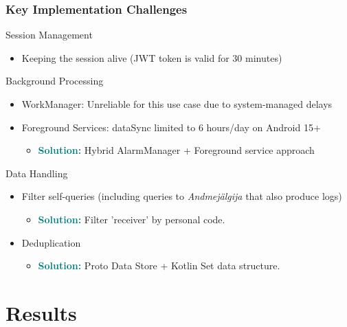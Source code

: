 \documentclass[aspectratio=169,11pt]{beamer}
\begin{document}
\begin{frame}
\frametitle{Key Implementation Challenges}
\begin{block}{Session Management}
\begin{itemize}
    \item Keeping the session alive (JWT token is valid for 30 minutes)
\end{itemize}
\end{block}

\begin{block}{Background Processing}
\begin{itemize}
    \item WorkManager: Unreliable for this use case due to system-managed delays
    \item Foreground Services: dataSync limited to 6 hours/day on Android 15+
    \begin{itemize}
        \item \textcolor{teal}{\textbf{Solution:}} Hybrid AlarmManager + Foreground service approach
    \end{itemize}
\end{itemize}
\end{block}

\begin{block}{Data Handling}
\begin{itemize}
    \item Filter self-queries (including queries to \textit{Andmejälgija} that also produce logs)
    \begin{itemize}
        \item \textcolor{teal}{\textbf{Solution:}} Filter 'receiver' by personal code.
    \end{itemize}
    \item Deduplication
    \begin{itemize}
        \item \textcolor{teal}{\textbf{Solution:}} Proto Data Store + Kotlin Set data structure.
    \end{itemize}
\end{itemize}
\end{block}
\end{frame}

\section{Results}
\end{document}
